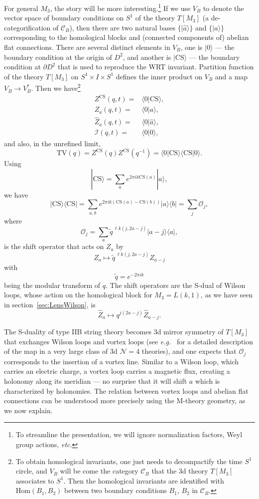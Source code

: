 \documentclass[hyper,letterpaper]{JHEP3}
\newcommand{\bea}{\begin{eqnarray}}
\newcommand{\eea}{\end{eqnarray}}
\newcommand{\be}{\begin{equation}}
\newcommand{\ee}{\end{equation}}
\def\tilde{\widetilde}
\renewcommand{\hat}{\widehat}
\def\CC{{\mathcal C}}
\def\CI{{\mathcal I}}
\def\CN{{\mathcal N}}
\def\CO{{\mathcal O}}
\def\eg{{\textit{e.g.}}}
\def\lk{{\ell k}}
\begin{document}
{For general $M_3$, the story will be more interesting.\footnote{To streamline the presentation, we will ignore normalization factors, Weyl group actions, \textit{etc}.} If we use $V_B$ to denote the vector space of boundary conditions on $S^1$ of the theory $T[M_3]$ (a de-categorification of $\CC_B$), then there are two natural bases $\{|\hat{a}\rangle\}$ and $\{|a\rangle\}$ corresponding to the homological blocks and (connected components of) abelian flat connections. There are several distinct elements in $V_B$, one is $|0\rangle$ --- the boundary condition at the origin of $D^2$, and another is $|\text{CS}\rangle$ --- the boundary condition at $\partial D^2$ that is used to reproduce the WRT invariant. Partition function of the theory $T[M_3]$ on $S^1\times I\times S^1$ defines the inner product on $V_B$ and a map $V_B\rightarrow V_B^*$. Then we have\footnote{To obtain homological invariants, one just needs to decompactify the time $S^1$ circle, and $V_B$ will be come the category $\CC_B$ that the 3d theory $T[M_3]$ associates to $S^1$. Then the homological invariants are identified with $\mathrm{Hom}(B_1,B_2)$ between two boundary conditions $B_1$, $B_2$ in $\CC_B$.}
\bea
Z^{\text{CS}}(q,t)=&\langle 0 | \text{CS} \rangle,\\
Z_a(q,t) =&\langle 0 | a \rangle,\\
\hat{Z}_a(q,t) =&\langle 0 | \hat{a} \rangle,\\
\CI(q,t) =&\langle 0|0 \rangle,
\eea
and also, in the unrefined limit,
\be
\mathrm{TV}(q)=Z^{\text{CS}}(q)Z^{\text{CS}}(q^{-1})=\langle 0 | \text{CS}\rangle \langle \text{CS}|0\rangle.
\ee
Using
\be
| \text{CS}\rangle=\sum_a e^{2\pi ik\text{CS}(a)}|a \rangle,
\ee
we have
\be
| \text{CS}\rangle \langle \text{CS}|=\sum_{a,b}e^{2\pi ik\left(\text{CS}(a)-\text{CS}(b)\right)}|a \rangle\langle b|=\sum_{j}\CO_j,
\ee
where
\be
\CO_j=\sum_{a}\tilde{q}^{\,\lk(j,2a-j)}|a-j \rangle\langle a|,
\ee
is the shift operator that acts on $Z_a$ by
\be
Z_a\mapsto \tilde{q}^{\,\lk(j,2a-j)} Z_{a-j}
\ee
with
\be
\tilde{q}=e^{-2\pi i k}
\ee
being the modular transform of $q$. The shift operators are the S-dual of Wilson loops, whose action on the homological block for $M_3=L(k,1)$, as we have seen in section~\ref{sec:LensWilson}, is
\be
\hat{Z}_a\mapsto {q}^{j(2a-j)} \hat{Z}_{a-j}.
\ee

The S-duality of type IIB string theory becomes 3d mirror symmetry of $T[M_3]$ that exchanges Wilson loops and vortex loops (see \eg~\cite{Assel:2015oxa} for a detailed description of the map in a very large class of 3d $\CN=4$ theories), and one expects that $\CO_j$ corresponds to the insertion of a vortex line. Similar to a Wilson loop, which carries an electric charge, a vortex loop carries a magnetic flux, creating a holonomy along its meridian --- no surprise that it will shift $a$ which is characterized by holonomies. The relation between vortex loops and abelian flat connections can be understood more precisely using the M-theory geometry, as we now explain.

}
\end{document}
